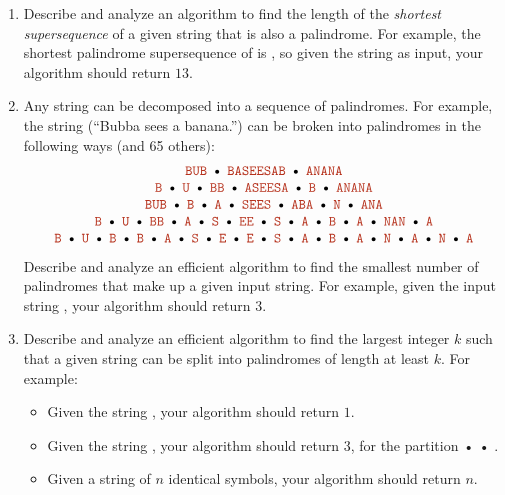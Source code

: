 \begin{enumerate}[label=\arabic*.,ref=\thechapter.\arabic*,leftmargin=*,align=left,widest*=99,itemsep=1.5ex plus 0.5ex]
\begin{enumerate}
For example, the longest palindrome subsequence of the string  is ; thus, given that string as input, your algorithm should return $11$.
\item Describe and analyze an algorithm to find the length of the \textit{shortest supersequence} of a given string that is also a palindrome.
For example, the shortest palindrome supersequence of  is , so given the string  as input, your algorithm should return $13$.
\item Any string can be decomposed into a sequence of palindromes.
For example, the string  (“Bubba sees a banana.”) can be broken into palindromes in the following ways (and 65 others):
\[
\begin{array}{c}
\mbox{\Str{BUB} • \Str{BASEESAB} • \Str{ANANA}}\\
\mbox{\Str{B} • \Str{U} • \Str{BB} • \Str{ASEESA} • \Str{B} • \Str{ANANA}}\\
\mbox{\Str{BUB} • \Str{B} • \Str{A} • \Str{SEES} • \Str{ABA} • \Str{N} • \Str{ANA}}\\
\mbox{\Str{B} • \Str{U} • \Str{BB} • \Str{A} • \Str{S} • \Str{EE} • \Str{S} • \Str{A} • \Str{B} • \Str{A} • \Str{NAN} • \Str{A}}\\
\mbox{\Str{B} • \Str{U} • \Str{B} • \Str{B} • \Str{A} • \Str{S} • \Str{E} • \Str{E} • \Str{S} • \Str{A} • \Str{B} • \Str{A} • \Str{N} • \Str{A} • \Str{N} • \Str{A}}
\end{array}
\]
Describe and analyze an efficient algorithm to find the smallest number of palindromes that make up a given input string.
For example, given the input string , your algorithm should return $3$.
\item Describe and analyze an efficient algorithm to find the largest integer $k$ such that a given string can be split into palindromes of length at least $k$.
For example:
\begin{itemize}
\item Given the string , your algorithm should return $1$.
\item Given the string , your algorithm should return $3$, for the partition  •  • .
\item Given a string of $n$ identical symbols, your algorithm should return $n$.

\end{itemize}
\end{enumerate}
\end{enumerate}
